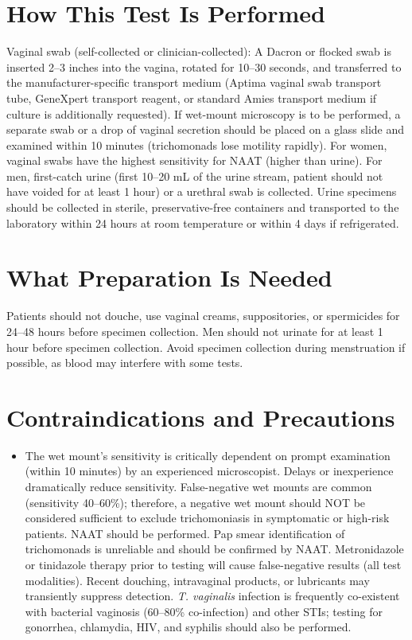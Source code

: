 \section*{How This Test Is Performed}
Vaginal swab (self-collected or clinician-collected): A Dacron or flocked swab is inserted 2--3 inches into the vagina, rotated for 10--30 seconds, and transferred to the manufacturer-specific transport medium (Aptima vaginal swab transport tube, GeneXpert transport reagent, or standard Amies transport medium if culture is additionally requested). If wet-mount microscopy is to be performed, a separate swab or a drop of vaginal secretion should be placed on a glass slide and examined within 10 minutes (trichomonads lose motility rapidly). For women, vaginal swabs have the highest sensitivity for NAAT (higher than urine). For men, first-catch urine (first 10--20 mL of the urine stream, patient should not have voided for at least 1 hour) or a urethral swab is collected. Urine specimens should be collected in sterile, preservative-free containers and transported to the laboratory within 24 hours at room temperature or within 4 days if refrigerated.

\section*{What Preparation Is Needed}
Patients should not douche, use vaginal creams, suppositories, or spermicides for 24--48 hours before specimen collection. Men should not urinate for at least 1 hour before specimen collection. Avoid specimen collection during menstruation if possible, as blood may interfere with some tests.

\section*{Contraindications and Precautions}
\begin{itemize}
  \item The wet mount's sensitivity is critically dependent on prompt examination (within 10 minutes) by an experienced microscopist. Delays or inexperience dramatically reduce sensitivity. False-negative wet mounts are common (sensitivity 40--60\%); therefore, a negative wet mount should NOT be considered sufficient to exclude trichomoniasis in symptomatic or high-risk patients. NAAT should be performed. Pap smear identification of trichomonads is unreliable and should be confirmed by NAAT. Metronidazole or tinidazole therapy prior to testing will cause false-negative results (all test modalities). Recent douching, intravaginal products, or lubricants may transiently suppress detection. \textit{T. vaginalis} infection is frequently co-existent with bacterial vaginosis (60--80\% co-infection) and other STIs; testing for gonorrhea, chlamydia, HIV, and syphilis should also be performed.
\end{itemize}
